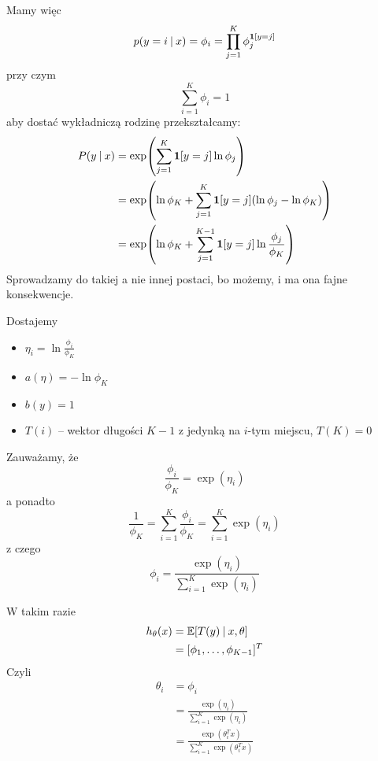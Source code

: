 Mamy więc
\[
	p(y = i \:\vert\: x) = \phi_i = \prod_{j=1}^K \phi_j^{\mathbf{1}\left[y=j\right]}
\]
przy czym
\[
	\sum_{i=1}^K \phi_i = 1
\]
aby dostać wykładniczą rodzinę przekształcamy:
\begin{align*}
	P(y \given x)
	 & = \exp\pars{\sum_{j=1}^K \indicator{y = j} \ln \phi_j}                                 \\
	 & = \exp\pars{\ln \phi_K + \sum_{j=1}^K \indicator{y = j} (\ln \phi_j - \ln \phi_K)}     \\
	 & = \exp\pars{\ln \phi_K + \sum_{j=1}^{K-1} \indicator{y = j} \ln \frac{\phi_j}{\phi_K}} \\
\end{align*}
Sprowadzamy do takiej a nie innej postaci, bo możemy, i ma ona fajne konsekwencje.

Dostajemy
\begin{itemize}
	\item \( \eta_i  = \ln \frac{\phi_i}{\phi_K} \)
	\item \( a(\eta) = -\ln \phi_K \)
	\item \( b(y) = 1 \)
	\item \( T(i) \) -- wektor długości \( K - 1 \) z jedynką na \(i\)-tym miejscu, \( T(K) = 0 \)
\end{itemize}

Zauważamy, że
\[
	\frac{\phi_i}{\phi_K} = \exp(\eta_i)
\]
a ponadto
\[
	\frac{1}{\phi_K} = \sum_{i=1}^K \frac{\phi_i}{\phi_K} = \sum_{i=1}^K \exp(\eta_i)
\]
z czego
\[
	\phi_i = \frac{\exp(\eta_i)}{\sum_{i=1}^K \exp(\eta_i)}
\]

W takim razie
\begin{align*}
	h_\theta(x)
	 & = \expected{T(y) \given x, \theta} \\
	 & = [\phi_1, \dots, \phi_{K-1}]^T
\end{align*}
Czyli
\begin{align*}
	\theta_i
	 & = \phi_i                                                     \\
	 & = \frac{\exp(\eta_i)}{\sum_{i=1}^K \exp(\eta_i)}             \\
	 & = \frac{\exp(\theta^T_i x)}{\sum_{i=1}^K \exp(\theta^T_i x)}
\end{align*}